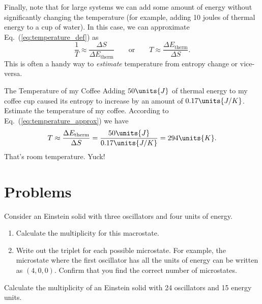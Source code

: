 Finally, note that for large systems we can add some amount of energy
without significantly changing the temperature (for example, adding 10
joules of thermal energy to a cup of water).  In this case, we can
approximate Eq.~(\ref{eq:temperature_def}) as
\begin{equation}
\frac{1}{T} \approx \frac{\Delta S}{\Delta E_\text{therm}} 
\qquad\text{or}\qquad
T \approx  \frac{\Delta E_\text{therm}}{\Delta S}.
\label{eq:temperature_approx}
\end{equation}
This is often a handy way to {\em estimate} temperature from entropy change
or vice-versa.

\begin{example}{The Temperature of my Coffee}
Adding $50\units{J}$ of thermal energy to my coffee cup caused its
entropy to increase by an amount of $0.17\units{J/K}$.  Estimate the
temperature of my coffee.
\solution
According to Eq.~(\ref{eq:temperature_approx}) we have
\begin{equation}
T \approx  \frac{\Delta E_\text{therm}}{\Delta S} = 
\frac{50\units{J}}{0.17\units{J/K}} = 294\units{K}.
\end{equation}
That's room temperature.  Yuck!
\end{example}

\newpage

\section*{Problems}

\begin{problem}
Consider an Einstein solid with three oscillators and four units of
energy.
\begin{enumerate}
\item Calculate the multiplicity for this macrostate.
\item Write out the triplet for each possible microstate.  For
  example, the microstate where the first oscillator has all the units
  of energy can be written as $(4,0,0)$.  Confirm that you find the
  correct number of microstates.
\end{enumerate}
\label{prob:multiplicityforthree}
\end{problem}

\begin{problem}
Calculate the multiplicity of an Einstein solid with 24 oscillators
and 15 energy units.  
\label{prob:mult_of_twentyfour}
\end{problem}

